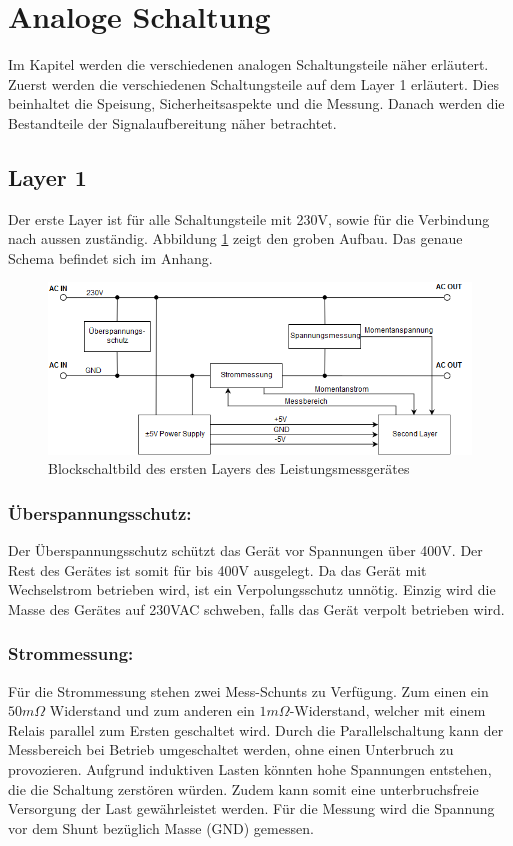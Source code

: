 \section{Analoge Schaltung} 
\label{sec:analoge_schaltung}
Im Kapitel werden die verschiedenen analogen Schaltungsteile näher erläutert. Zuerst werden die verschiedenen Schaltungsteile auf dem Layer 1 erläutert. Dies beinhaltet die Speisung, Sicherheitsaspekte und die Messung. Danach werden die Bestandteile der Signalaufbereitung näher betrachtet.

\subsection{Layer 1}%
Der erste Layer ist für alle Schaltungsteile mit 230V, sowie für die Verbindung nach aussen zuständig. Abbildung \ref{fig:first_layer} zeigt den groben Aufbau. Das genaue Schema befindet sich im Anhang.

\begin{figure}[H]
\begin{center}
	\includegraphics[width=160mm]{images/first_layer.png}
	\caption{Blockschaltbild des ersten Layers des Leistungsmessgerätes} %
	\label{fig:first_layer}
\end{center}
\end{figure}

\subsubsection*{Überspannungsschutz:}
Der Überspannungsschutz schützt das Gerät vor Spannungen über 400V. Der Rest des Gerätes ist somit für bis 400V ausgelegt. Da das Gerät mit Wechselstrom betrieben wird, ist ein Verpolungsschutz unnötig. Einzig wird die Masse des Gerätes auf 230VAC schweben, falls das Gerät verpolt betrieben wird.

\subsubsection*{Strommessung:}
Für die Strommessung stehen zwei Mess-Schunts zu Verfügung. Zum einen ein $50m\Omega$ Widerstand und zum anderen ein $1m\Omega$-Widerstand, welcher mit einem Relais parallel zum Ersten geschaltet wird. Durch die Parallelschaltung kann der Messbereich bei Betrieb umgeschaltet werden, ohne einen Unterbruch zu provozieren. Aufgrund induktiven Lasten könnten hohe Spannungen entstehen, die die Schaltung zerstören würden. Zudem kann somit eine unterbruchsfreie Versorgung der Last gewährleistet werden. Für die Messung wird die Spannung vor dem Shunt bezüglich Masse (GND) gemessen.


